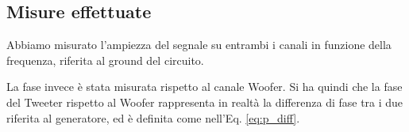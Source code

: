 \documentclass[../Relazione_circuiti]{subfiles}
\begin{document}
\subsection{Misure effettuate}
  Abbiamo misurato l'ampiezza del segnale su entrambi i canali in funzione della frequenza, riferita al ground del
  circuito.

  La fase invece è stata misurata rispetto al canale Woofer. Si ha quindi che la fase del Tweeter rispetto al Woofer
  rappresenta in realtà la differenza di fase tra i due riferita al generatore, ed è definita come nell'Eq.
      \eqref{eq:p_diff}.
\end{document}
